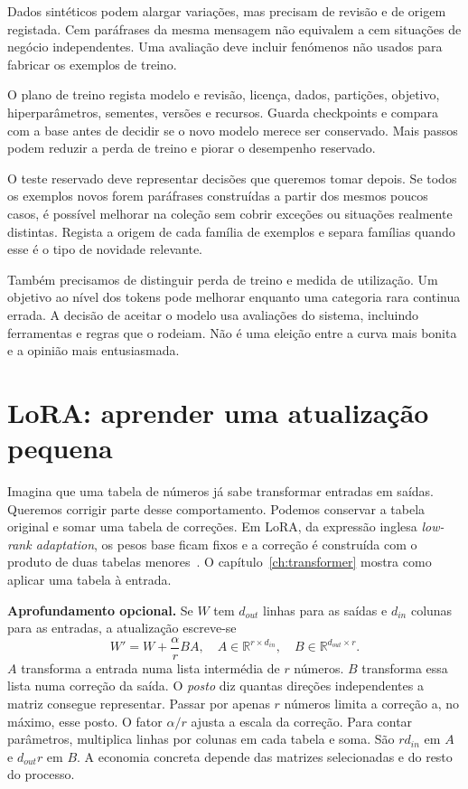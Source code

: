 Dados sintéticos podem alargar variações, mas precisam de revisão e de origem registada. Cem paráfrases da mesma mensagem não equivalem a cem situações de negócio independentes. Uma avaliação deve incluir fenómenos não usados para fabricar os exemplos de treino.

O plano de treino regista modelo e revisão, licença, dados, partições, objetivo, hiperparâmetros, sementes, versões e recursos. Guarda checkpoints e compara com a base antes de decidir se o novo modelo merece ser conservado. Mais passos podem reduzir a perda de treino e piorar o desempenho reservado.

O teste reservado deve representar decisões que queremos tomar depois. Se todos os exemplos novos forem paráfrases construídas a partir dos mesmos poucos casos, é possível melhorar na coleção sem cobrir exceções ou situações realmente distintas. Regista a origem de cada família de exemplos e separa famílias quando esse é o tipo de novidade relevante.

Também precisamos de distinguir perda de treino e medida de utilização. Um objetivo ao nível dos tokens pode melhorar enquanto uma categoria rara continua errada. A decisão de aceitar o modelo usa avaliações do sistema, incluindo ferramentas e regras que o rodeiam. Não é uma eleição entre a curva mais bonita e a opinião mais entusiasmada.

\section{LoRA: aprender uma atualização pequena}
Imagina que uma tabela de números já sabe transformar entradas em saídas. Queremos corrigir parte desse comportamento. Podemos conservar a tabela original e somar uma tabela de correções. Em LoRA, da expressão inglesa \emph{low-rank adaptation}, os pesos base ficam fixos e a correção é construída com o produto de duas tabelas menores~\citep{hu2022lora}. O capítulo~\ref{ch:transformer} mostra como aplicar uma tabela à entrada.

\textbf{Aprofundamento opcional.} Se $W$ tem $d_{out}$ linhas para as saídas e $d_{in}$ colunas para as entradas, a atualização escreve-se
\[
W'=W+\frac{\alpha}{r}BA,
\quad A\in\mathbb R^{r\times d_{in}},\quad B\in\mathbb R^{d_{out}\times r}.
\]
$A$ transforma a entrada numa lista intermédia de $r$ números. $B$ transforma essa lista numa correção da saída. O \emph{posto} diz quantas direções independentes a matriz consegue representar. Passar por apenas $r$ números limita a correção a, no máximo, esse posto. O fator $\alpha/r$ ajusta a escala da correção. Para contar parâmetros, multiplica linhas por colunas em cada tabela e soma. São $rd_{in}$ em $A$ e $d_{out}r$ em $B$. A economia concreta depende das matrizes selecionadas e do resto do processo.

